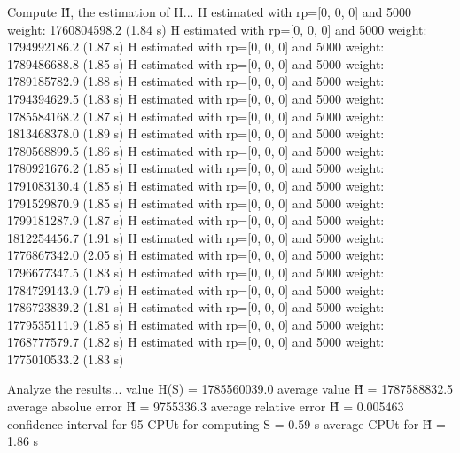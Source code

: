 Compute H̃, the estimation of H...
  H estimated with rp=[0, 0, 0] and 5000 weight:  1760804598.2  (1.84 s)
  H estimated with rp=[0, 0, 0] and 5000 weight:  1794992186.2  (1.87 s)
  H estimated with rp=[0, 0, 0] and 5000 weight:  1789486688.8  (1.85 s)
  H estimated with rp=[0, 0, 0] and 5000 weight:  1789185782.9  (1.88 s)
  H estimated with rp=[0, 0, 0] and 5000 weight:  1794394629.5  (1.83 s)
  H estimated with rp=[0, 0, 0] and 5000 weight:  1785584168.2  (1.87 s)
  H estimated with rp=[0, 0, 0] and 5000 weight:  1813468378.0  (1.89 s)
  H estimated with rp=[0, 0, 0] and 5000 weight:  1780568899.5  (1.86 s)
  H estimated with rp=[0, 0, 0] and 5000 weight:  1780921676.2  (1.85 s)
  H estimated with rp=[0, 0, 0] and 5000 weight:  1791083130.4  (1.85 s)
  H estimated with rp=[0, 0, 0] and 5000 weight:  1791529870.9  (1.85 s)
  H estimated with rp=[0, 0, 0] and 5000 weight:  1799181287.9  (1.87 s)
  H estimated with rp=[0, 0, 0] and 5000 weight:  1812254456.7  (1.91 s)
  H estimated with rp=[0, 0, 0] and 5000 weight:  1776867342.0  (2.05 s)
  H estimated with rp=[0, 0, 0] and 5000 weight:  1796677347.5  (1.83 s)
  H estimated with rp=[0, 0, 0] and 5000 weight:  1784729143.9  (1.79 s)
  H estimated with rp=[0, 0, 0] and 5000 weight:  1786723839.2  (1.81 s)
  H estimated with rp=[0, 0, 0] and 5000 weight:  1779535111.9  (1.85 s)
  H estimated with rp=[0, 0, 0] and 5000 weight:  1768777579.7  (1.82 s)
  H estimated with rp=[0, 0, 0] and 5000 weight:  1775010533.2  (1.83 s)

Analyze the results...
  value H(S)                  = 1785560039.0 
  average value H̃             = 1787588832.5 
  average absolue error H̃     = 9755336.3 
  average relative error H̃    = 0.005463 
  confidence interval for 95%
  CPUt for computing S         = 0.59 s
  average CPUt for H̃           = 1.86 s


